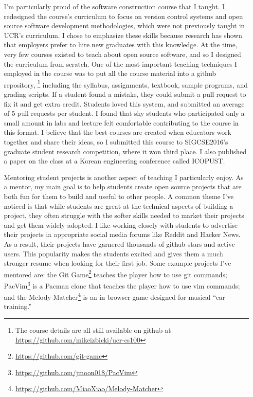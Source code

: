 \documentclass[12pt]{article}
\begin{document}
I'm particularly proud of the software construction course that I taught.
I redesigned the course's curriculum to focus on version control systems and open source software development methodologies,
which were not previously taught in UCR's curriculum.
I chose to emphasize these skills because research has shown that employers prefer to hire new graduates with this knowledge.
At the time, very few courses existed to teach about open source software,
and so I designed the curriculum from scratch.
One of the most important teaching techniques I employed in the course was to put all the course material into a github repository,%
\footnote{The course details are all still available on github at \url{https://github.com/mikeizbicki/ucr-cs100}}
including the syllabus, assignments, textbook, sample programs, and grading scripts.
If a student found a mistake,
they could submit a pull request to fix it and get extra credit.
Students loved this system, and submitted an average of 5 pull requests per student.
I found that shy students who participated only a small amount in labs and lecture felt comfortable contributing to the course in this format.
I believe that the best courses are created when educators work together and share their ideas,
so I submitted this course to SIGCSE2016's graduate student research competition,
where it won third place.
I also published a paper on the class at a Korean engineering conference called ICOPUST.

Mentoring student projects is another aspect of teaching I particularly enjoy. 
As a mentor, my main goal is to help students create open source projects that are both fun for them to build and useful to other people.
A common theme I've noticed is that while students are great at the technical aspects of building a project,
they often struggle with the softer skills needed to market their projects and get them widely adopted.
I like working closely with students to advertise their projects in appropriate social media forums like Reddit and Hacker News.
As a result, their projects have garnered thousands of github stars and active users.
This popularity makes the students excited and gives them a much stronger resume when looking for their first job.
Some example projects I've mentored are: 
the Git Game\footnote{\url{https://github.com/git-game}} teaches the player how to use git commands;
PacVim\footnote{\url{https://github.com/jmoon018/PacVim}} is a Pacman clone that teaches the player how to use vim commands;
and the Melody Matcher\footnote{\url{https://github.com/MiaoXiao/Melody-Matcher}} is an in-browser game designed for musical ``ear training.''
\end{document}
